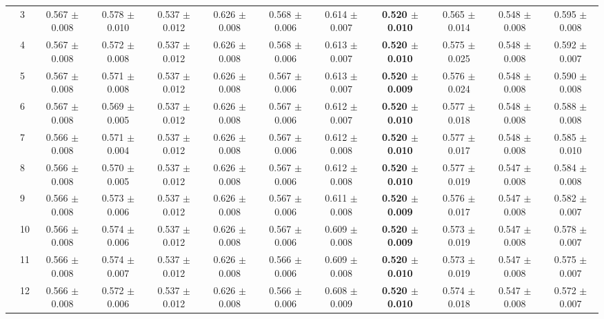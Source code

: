 \begin{table*}[t]
{\begin{tabular}{%
  ll
  @{\quad}
  c@{\hskip 4pt}c
  @{\quad\quad}
  c@{\hskip 4pt}c
  @{\quad\quad}
  c@{\hskip 4pt}c
  @{\quad\quad}
  c@{\hskip 4pt}c
  @{\quad\quad}
  c@{\hskip 4pt}c
}
        & 3 & 0.567 $\pm$ 0.008 & 0.578 $\pm$ 0.010 & 0.537 $\pm$ 0.012 & 0.626 $\pm$ 0.008 & 0.568 $\pm$ 0.006 & 0.614 $\pm$ 0.007 & \textbf{0.520 $\pm$ 0.010} & 0.565 $\pm$ 0.014 & 0.548 $\pm$ 0.008 & 0.595 $\pm$ 0.008 \\
        & 4 & 0.567 $\pm$ 0.008 & 0.572 $\pm$ 0.008 & 0.537 $\pm$ 0.012 & 0.626 $\pm$ 0.008 & 0.568 $\pm$ 0.006 & 0.613 $\pm$ 0.007 & \textbf{0.520 $\pm$ 0.010} & 0.575 $\pm$ 0.025 & 0.548 $\pm$ 0.008 & 0.592 $\pm$ 0.007 \\
        & 5 & 0.567 $\pm$ 0.008 & 0.571 $\pm$ 0.008 & 0.537 $\pm$ 0.012 & 0.626 $\pm$ 0.008 & 0.567 $\pm$ 0.006 & 0.613 $\pm$ 0.007 & \textbf{0.520 $\pm$ 0.009} & 0.576 $\pm$ 0.024 & 0.548 $\pm$ 0.008 & 0.590 $\pm$ 0.008 \\
        & 6 & 0.567 $\pm$ 0.008 & 0.569 $\pm$ 0.005 & 0.537 $\pm$ 0.012 & 0.626 $\pm$ 0.008 & 0.567 $\pm$ 0.006 & 0.612 $\pm$ 0.007 & \textbf{0.520 $\pm$ 0.010} & 0.577 $\pm$ 0.018 & 0.548 $\pm$ 0.008 & 0.588 $\pm$ 0.008 \\
        & 7 & 0.566 $\pm$ 0.008 & 0.571 $\pm$ 0.004 & 0.537 $\pm$ 0.012 & 0.626 $\pm$ 0.008 & 0.567 $\pm$ 0.006 & 0.612 $\pm$ 0.008 & \textbf{0.520 $\pm$ 0.010} & 0.577 $\pm$ 0.017 & 0.548 $\pm$ 0.008 & 0.585 $\pm$ 0.010 \\
        & 8 & 0.566 $\pm$ 0.008 & 0.570 $\pm$ 0.005 & 0.537 $\pm$ 0.012 & 0.626 $\pm$ 0.008 & 0.567 $\pm$ 0.006 & 0.612 $\pm$ 0.008 & \textbf{0.520 $\pm$ 0.010} & 0.577 $\pm$ 0.019 & 0.547 $\pm$ 0.008 & 0.584 $\pm$ 0.008 \\
        & 9 & 0.566 $\pm$ 0.008 & 0.573 $\pm$ 0.006 & 0.537 $\pm$ 0.012 & 0.626 $\pm$ 0.008 & 0.567 $\pm$ 0.006 & 0.611 $\pm$ 0.008 & \textbf{0.520 $\pm$ 0.009} & 0.576 $\pm$ 0.017 & 0.547 $\pm$ 0.008 & 0.582 $\pm$ 0.007 \\
        & 10 & 0.566 $\pm$ 0.008 & 0.574 $\pm$ 0.006 & 0.537 $\pm$ 0.012 & 0.626 $\pm$ 0.008 & 0.567 $\pm$ 0.006 & 0.609 $\pm$ 0.008 & \textbf{0.520 $\pm$ 0.009} & 0.573 $\pm$ 0.019 & 0.547 $\pm$ 0.008 & 0.578 $\pm$ 0.007 \\
        & 11 & 0.566 $\pm$ 0.008 & 0.574 $\pm$ 0.007 & 0.537 $\pm$ 0.012 & 0.626 $\pm$ 0.008 & 0.566 $\pm$ 0.006 & 0.609 $\pm$ 0.008 & \textbf{0.520 $\pm$ 0.010} & 0.573 $\pm$ 0.019 & 0.547 $\pm$ 0.008 & 0.575 $\pm$ 0.007 \\
        & 12 & 0.566 $\pm$ 0.008 & 0.572 $\pm$ 0.006 & 0.537 $\pm$ 0.012 & 0.626 $\pm$ 0.008 & 0.566 $\pm$ 0.006 & 0.608 $\pm$ 0.009 & \textbf{0.520 $\pm$ 0.010} & 0.574 $\pm$ 0.018 & 0.547 $\pm$ 0.008 & 0.572 $\pm$ 0.007 \\

\end{tabular}}
\end{table*}
